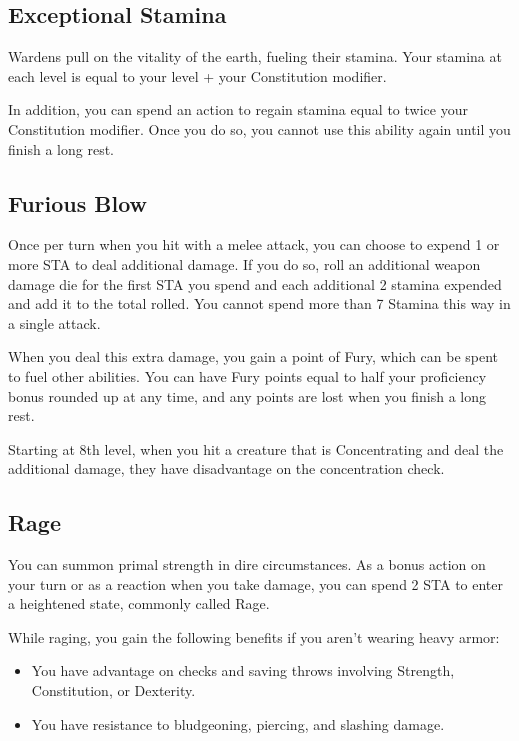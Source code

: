 \subsection{Exceptional Stamina}
Wardens pull on the vitality of the earth, fueling their stamina. Your stamina at each level is equal to your level + your Constitution modifier.

In addition, you can spend an action to regain stamina equal to twice your Constitution modifier. Once you do so, you cannot use this ability again until you finish a long rest.

\subsection{Furious Blow}
Once per turn when you hit with a melee attack, you can choose to expend 1 or more STA to deal additional damage. If you do so, roll an additional weapon damage die for the first STA you spend and each additional 2 stamina expended and add it to the total rolled. You cannot spend more than 7 Stamina this way in a single attack.

When you deal this extra damage, you gain a point of Fury, which can be spent to fuel other abilities. You can have Fury points equal to half your proficiency bonus rounded up at any time, and any points are lost when you finish a long rest.

Starting at 8th level, when you hit a creature that is Concentrating and deal the additional damage, they have disadvantage on the concentration check.

\subsection{Rage}

You can summon primal strength in dire circumstances. As a bonus action on your turn or as a reaction when you take damage, you can spend 2 STA to enter a heightened state, commonly called Rage.

While raging, you gain the following benefits if you aren't wearing heavy armor:

\begin{itemize}
\item You have advantage on checks and saving throws involving Strength, Constitution, or Dexterity.
\item You have resistance to bludgeoning, piercing, and slashing damage.
\end{itemize}

